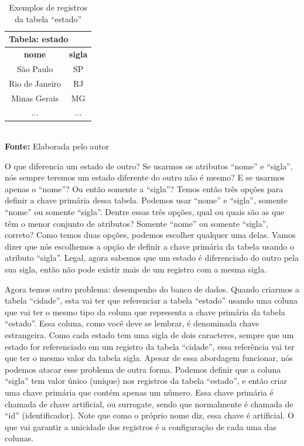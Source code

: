\FloatBarrier
\begin{table}[ht]
    \centering
    \caption{Exemplos de registros da tabela ``estado''}
	\begin{tabular}{cc}
	    \hline
	    \multicolumn{2}{l}{\textbf{Tabela: estado}} \\ \hline
	    \textbf{nome}  &       \textbf{sigla}       \\ \hline
	      São Paulo    &             SP             \\ \hline
	    Rio de Janeiro &             RJ             \\ \hline
	     Minas Gerais  &             MG             \\ \hline
	         ...       &            ...             \\ \hline
	\end{tabular}
    \\ \vspace{0.2cm}
    \textbf{Fonte:} Elaborada pelo autor
    \label{tab:exemplosEstados}
\end{table}
\FloatBarrier


O que diferencia um estado de outro? Se usarmos os atributos ``nome'' e ``sigla'', nós sempre teremos um estado diferente do outro não é mesmo? E se usarmos apenas o ``nome''? Ou então somente a ``sigla''? Temos então três opções para definir a chave primária dessa tabela. Podemos usar ``nome'' e ``sigla'', somente ``nome'' ou somente ``sigla''. Dentre essas três opções, qual ou quais são as que têm o menor conjunto de atributos? Somente ``nome'' ou somente ``sigla'', correto? Como temos duas opções, podemos escolher qualquer uma delas. Vamos dizer que nós escolhemos a opção de definir a chave primária da tabela usando o atributo ``sigla''. Legal, agora sabemos que um estado é diferenciado do outro pela sua sigla, então não pode existir mais de um registro com a mesma sigla.

Agora temos outro problema: desempenho do banco de dados. Quando criarmos a tabela ``cidade'', esta vai ter que referenciar a tabela ``estado'' usando uma coluna que vai ter o mesmo tipo da coluna que representa a chave primária da tabela ``estado''. Essa coluna, como você deve se lembrar, é denominada chave estrangeira. Como cada estado tem uma sigla de dois caracteres, sempre que um estado for referenciado em um registro da tabela ``cidade'', essa referência vai ter que ter o mesmo valor da tabela sigla. Apesar de essa abordagem funcionar, nós podemos atacar esse problema de outra forma. Podemos definir que a coluna ``sigla'' tem valor único (unique) nos registros da tabela ``estado'', e então criar uma chave primária que contém apenas um número. Essa chave primária é chamada de chave artificial, ou surrogate, sendo que normalmente é chamada de ``id'' (identificador). Note que como o próprio nome diz, essa chave é artificial. O que vai garantir a unicidade dos registros é a configuração de cada uma das colunas. 


